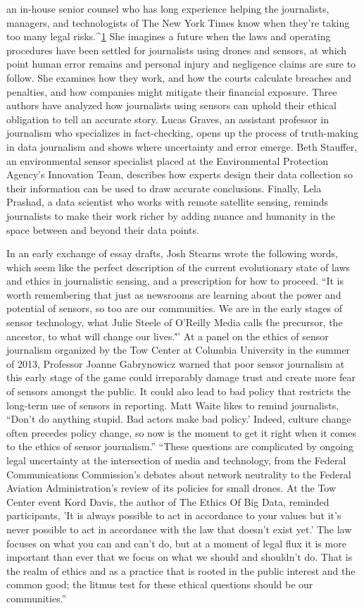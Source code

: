 an in-house senior counsel who has long experience helping the journalists,
managers, and technologists of The New York Times know when they're taking
too many legal risks.^{\href{#endnotes-syed}{1}} She imagines a future when the laws and operating
procedures have been settled for journalists using drones and sensors, at
which point human error remains and personal injury and negligence
claims are sure to follow. She examines how they work, and how the courts
calculate breaches and penalties, and how companies might mitigate their
financial exposure.
Three authors have analyzed how journalists using sensors can uphold their
ethical obligation to tell an accurate story. Lucas Graves, an assistant professor
in journalism who specializes in fact-checking, opens up the process
of truth-making in data journalism and shows where uncertainty and error
emerge. Beth Stauffer, an environmental sensor specialist placed at the Environmental
Protection Agency's Innovation Team, describes how experts
design their data collection so their information can be used to draw accurate
conclusions. Finally, Lela Prashad, a data scientist who works with remote
satellite sensing, reminds journalists to make their work richer by adding
nuance and humanity in the space between and beyond their data points.


In an early exchange of essay drafts, Josh Stearns wrote the following
words, which seem like the perfect description of the current evolutionary
state of laws and ethics in journalistic sensing, and a prescription for how
to proceed.
``It is worth remembering that just as newsrooms are learning about
the power and potential of sensors, so too are our communities.
We are in the early stages of sensor technology, what Julie Steele of
O'Reilly Media calls \'the precursor, the ancestor, to what will change
our lives.\''' At a panel on the ethics of sensor journalism organized
by the Tow Center at Columbia University in the summer of 2013,
Professor Joanne Gabrynowicz warned that poor sensor journalism
at this early stage of the game could irreparably damage trust and
create more fear of sensors amongst the public. It could also lead to
bad policy that restricts the long-term use of sensors in reporting.
Matt Waite likes to remind journalists, ``Don't do anything stupid.
Bad actors make bad policy.' Indeed, culture change often precedes
policy change, so now is the moment to get it right when it comes to
the ethics of sensor journalism.''
``These questions are complicated by ongoing legal uncertainty at the
intersection of media and technology, from the Federal Communications
Commission's debates about network neutrality to the Federal
Aviation Administration's review of its policies for small drones. At
the Tow Center event Kord Davis, the author of The Ethics Of Big
Data, reminded participants, 'It is always possible to act in accordance
to your values but it's never possible to act in accordance with
the law that doesn't exist yet.' The law focuses on what you can and
can't do, but at a moment of legal flux it is more important than ever
that we focus on what we should and shouldn't do. That is the realm
of ethics and as a practice that is rooted in the public interest and the
common good; the litmus test for these ethical questions should be
our communities.''

